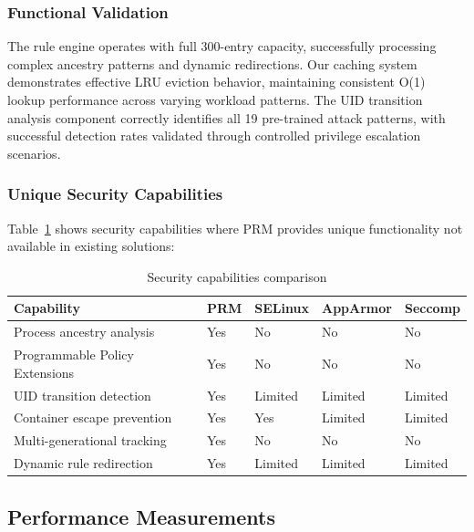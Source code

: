 \documentclass[]{sn-jnl}
\begin{document}
\subsubsection{Functional Validation}

The rule engine operates with full 300-entry capacity, successfully processing
complex ancestry patterns and dynamic redirections. Our caching system demonstrates
effective LRU eviction behavior, maintaining consistent O(1) lookup performance
across varying workload patterns. The UID transition analysis component correctly
identifies all 19 pre-trained attack patterns, with successful detection rates
validated through controlled privilege escalation scenarios.

\subsubsection{Unique Security Capabilities}

Table~\ref{tab:capabilities} shows security capabilities where PRM provides
unique functionality not available in existing solutions:

\begin{table}[htbp]
\caption{Security capabilities comparison}
\label{tab:capabilities}
\centering
\begin{tabular}{@{}p{3.0cm}p{0.3cm}p{0.7cm}p{0.9cm}p{0.8cm}@{}}
\toprule
\textbf{Capability} & \textbf{PRM} & \textbf{SELinux} & \textbf{AppArmor} & \textbf{Seccomp} \\
\midrule
Process ancestry analysis       & Yes & No      & No      & No \\
Programmable Policy Extensions  & Yes & No      & No      & No \\
UID transition detection        & Yes & Limited & Limited & Limited \\
Container escape prevention     & Yes & Yes     & Limited & Limited \\
Multi-generational tracking     & Yes & No      & No      & No \\
Dynamic rule redirection        & Yes & Limited & Limited & Limited \\
\bottomrule
\end{tabular}
\end{table}

\subsection{Performance Measurements}
\label{sec:performance_measurements}
\end{document}
